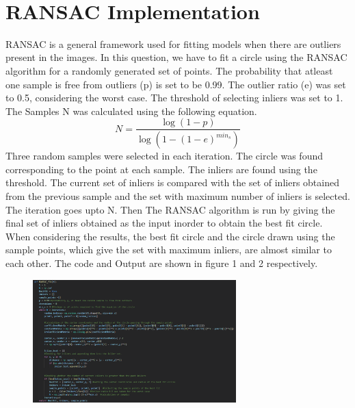 \documentclass[11pt]{article}
\begin{document}
\newpage
{}
\begin{flushleft}
\vspace*{-1cm}
\hspace*{-3.6cm}
\\
[0.4cm]
\hspace*{-3cm}
\section{RANSAC Implementation}
RANSAC is a general framework used for fitting models when there are outliers present in the images. In this question, we have to fit a circle using the RANSAC algorithm for a randomly generated set of points. The probability that atleast one sample is free from outliers (p) is set to be 0.99. The outlier ratio (e) was set to 0.5, considering the worst case. The threshold of selecting inliers was set to 1. The Samples N was calculated using the following equation.
\begin{equation}\label{Equation 1: Number of samples}
    N = \frac{\log(1-p)}{\log(1-(1-e)^{min_s})}
\end{equation}
Three random samples were selected in each iteration. The circle was found corresponding to the point at each sample. The inliers are found using the threshold. The current set of inliers is compared with the set of inliers obtained from the previous sample and the set with maximum number of inliers is selected. The iteration goes upto N. Then The RANSAC algorithm is run by giving the final set of inliers obtained as the input inorder to obtain the best fit circle. 
\newline
When considering the results, the best fit circle and the circle drawn using the sample points, which give the set with maximum inliers, are almost similar to each other. The code and Output are shown in figure 1 and 2 respectively.    
\begin{figure}[htp]
    \centering
    \includegraphics[width=0.7\textwidth]{Question1code.png}

\end{figure}
\end{flushleft}
\end{document}
